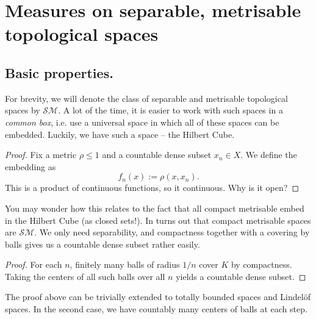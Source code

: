 \chapter{Measures on separable, metrisable topological spaces}

\section{Basic properties.}

For brevity, we will denote the class of separable and metrisable topological spaces by \( \mathcal{SM} \). A lot of the time, it is easier to work with such spaces in a \emph{common box}, i.e. use a universal space in which all of these spaces can be embedded. Luckily, we have such a space -- the Hilbert Cube.


\begin{proof}
    Fix a metric \( \rho \leqslant 1 \) and a countable dense subset \( x_n \in X \). We define the embedding as 
    \[ 
       f_n(x) := \rho(x, x_n). 
   \]
   This is a product of continuous functions, so it continuous. Why is it open?
\end{proof}

You may wonder how this relates to the fact that all compact metrisable embed in the Hilbert Cube (as closed sets!). In turns out that compact metrisable spaces are \( \mathcal{SM} \). We only need separability, and compactness together with a covering by balls gives us a countable dense subset rather easily.


\begin{proof}
For each \( n \), finitely many balls of radius \( 1/n \) cover \( K \) by compactness. Taking the centers of all such balls over all \( n \) yields a countable dense subset.
\end{proof}

The proof above can be trivially extended to totally bounded spaces and Lindel\"of spaces. In the second case, we have countably many centers of balls at each step.

